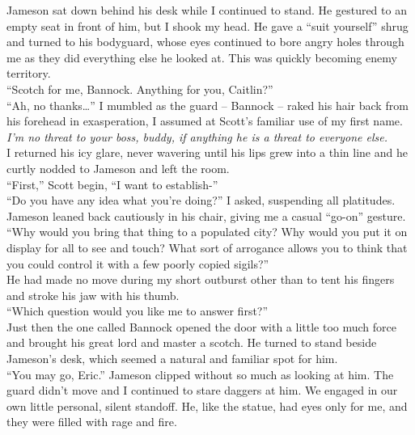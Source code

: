 \documentclass[a5paper]{scrartcl}
\begin{document}
Jameson sat down behind his desk while I continued to stand. He gestured to an empty seat in front of him, but I shook my head. He gave a \enquote{suit yourself} shrug and turned to his bodyguard, whose eyes continued to bore angry holes through me as they did everything else he looked at. This was quickly becoming enemy territory.\\


\enquote{Scotch for me, Bannock. Anything for you, Caitlin?}\\


\enquote{Ah, no thanks\dots } I mumbled as the guard -- Bannock -- raked his hair back from his forehead in exasperation, I assumed at Scott's familiar use of my first name. \textit{I'm no threat to your boss, buddy, if anything he is a threat to everyone else.}
\\


I returned his icy glare, never wavering until his lips grew into a thin line and he curtly nodded to Jameson and left the room.\\


\enquote{First,} Scott begin, \enquote{I want to establish-}\\


\enquote{Do you have any idea what you're doing?} I asked, suspending all platitudes.\\


Jameson leaned back cautiously in his chair, giving me a casual \enquote{go-on} gesture.\\


\enquote{Why would you bring that thing to a populated city? Why would you put it on display for all to see and touch? What sort of arrogance allows you to think that you could control it with a few poorly copied sigils?}\\


He had made no move during my short outburst other than to tent his fingers and stroke his jaw with his thumb.\\


\enquote{Which question would you like me to answer first?}\\


Just then the one called Bannock opened the door with a little too much force and brought his great lord and master a scotch. He turned to stand beside Jameson's desk, which seemed a natural and familiar spot for him.\\


\enquote{You may go, Eric.} Jameson clipped without so much as looking at him. The guard didn't move and I continued to stare daggers at him. We engaged in our own little personal, silent standoff. He, like the statue, had eyes only for me, and they were filled with rage and fire.\\
\end{document}
